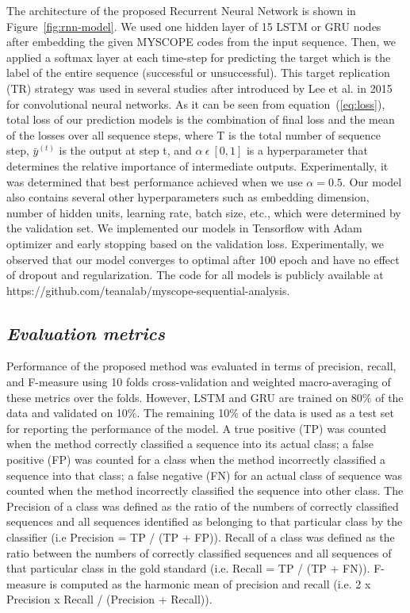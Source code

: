 \documentclass{amia_summit_2018}
\begin{document}
The architecture of the proposed Recurrent Neural Network is shown in Figure~\ref{fig:rnn-model}. We used one hidden layer of 15 LSTM or GRU nodes after embedding the given MYSCOPE codes from the input sequence. Then, we applied a softmax layer at each time-step for predicting the target which is the label of the entire sequence (successful or unsuccessful). This target replication (TR) strategy was used in several studies \cite{lipton2015learning, choi2016doctor} after introduced by Lee et al.\cite{lee2015deeply} in 2015 for convolutional neural networks. As it can be seen from equation~(\ref{eq:loss}), total loss of our prediction models is the combination of final loss and the mean of the losses over all sequence steps, where T is the total number of sequence step, $\bar y^{(t)}$ is the output at step t, and $\alpha\ \epsilon\ [0, 1]$ is a hyperparameter that determines the relative importance of intermediate outputs. Experimentally, it was determined that best performance achieved when we use  $\alpha=0.5$. Our model also contains several other hyperparameters such as embedding dimension, number of hidden units, learning rate, batch size, etc., which were determined by the validation set. We implemented our models in Tensorflow with Adam optimizer and early stopping based on the validation loss. Experimentally, we observed that our model converges to optimal after 100 epoch and have no effect of dropout and regularization. The code for all models is publicly available at https://github.com/teanalab/myscope-sequential-analysis.   
  
\subsection*{\textit{Evaluation metrics}}
Performance of the proposed method was evaluated in terms of precision, recall, and F-measure using 10 folds cross-validation and weighted macro-averaging of these metrics over the folds. However, LSTM and GRU are trained on 80\% of the data and validated on 10\%. The remaining 10\% of the data is used as a test set for reporting the performance of the model. A true positive (TP) was counted when the method correctly classified a sequence into its actual class; a false positive (FP) was counted for a class when the method incorrectly classified a sequence into that class; a false negative (FN) for an actual class of sequence was counted when the method incorrectly classified the sequence into other class. The Precision of a class was defined as the ratio of the numbers of correctly classified sequences and all sequences identified as belonging to that particular class by the classifier (i.e Precision = TP / (TP + FP)). Recall of a class was defined as the ratio between the numbers of correctly classified sequences and all sequences of that particular class in the gold standard (i.e. Recall = TP / (TP + FN)). F-measure is computed as the harmonic mean of precision and recall (i.e. 2 x Precision x Recall / (Precision + Recall)). 
\end{document}
